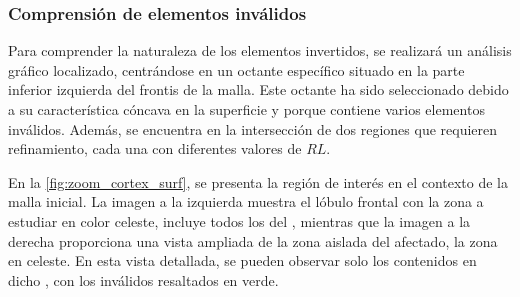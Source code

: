 \subsubsection{Comprensión de elementos inválidos}

Para comprender la naturaleza de los elementos invertidos, se realizará un análisis gráfico localizado, centrándose en un octante específico situado en la parte inferior izquierda del frontis de la malla. Este octante ha sido seleccionado debido a su característica cóncava en la superficie y porque contiene varios elementos inválidos. Además, se encuentra en la intersección de dos regiones que requieren refinamiento, cada una con diferentes valores de $RL$.

En la \autoref{fig:zoom_cortex_surf}, se presenta la región de interés en el contexto de la malla inicial. La imagen a la izquierda muestra el lóbulo frontal con la zona a estudiar en color celeste, incluye todos los \elements{} del \octant{}, mientras que la imagen a la derecha proporciona una vista ampliada de la zona aislada del \octant{} afectado, la zona en celeste. En esta vista detallada, se pueden observar solo los \elements{} contenidos en dicho \octant{}, con los \elements{} inválidos resaltados en verde.

